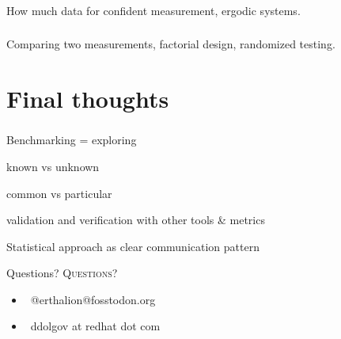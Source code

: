 \documentclass[usenames,dvipsnames, 18pt, compress, aspectratio=169]{beamer}
\def\social{{\faMastodon}}
\def\email{{\faEnvelope}}
\begin{document}
\begin{frame}
    \frametitle{}
    \begin{center}
        How much data for confident measurement, ergodic systems.
    \end{center}
\end{frame}

\begin{frame}
    \frametitle{}
    \begin{center}
        Comparing two measurements, factorial design, randomized testing.
    \end{center}
\end{frame}

\section{Final thoughts}

\begin{frame}
    \frametitle{}
    \begin{center}
        Benchmarking = exploring

        known vs unknown

        common vs particular

        validation and verification with other tools \& metrics

        Statistical approach as clear communication pattern
    \end{center}
\end{frame}

\fontsize{18pt}{18}\selectfont
\begin{frame}
  \vspace*{2.5cm}
  \begin{minipage}[b][\paperheight]{\textwidth}
  \begin{center}

      \linespread{1.0}%
      \if@noSmallCapitals%
        Questions?
      \else%
        \scshape{\color{black} Questions?}%
      \fi%
      \vspace*{0.3em}

      \fontsize{13pt}{14}\selectfont
        \begin{itemize}[label={}]
            \item {\color{black} \social\ @erthalion@fosstodon.org}
            \item {\color{black} \email\ ddolgov at redhat dot com}
        \end{itemize}
      \vspace*{2.5em}%

    \vfill
    \vspace*{2em}
  \end{center}
  \end{minipage}

\end{frame}
\end{document}
